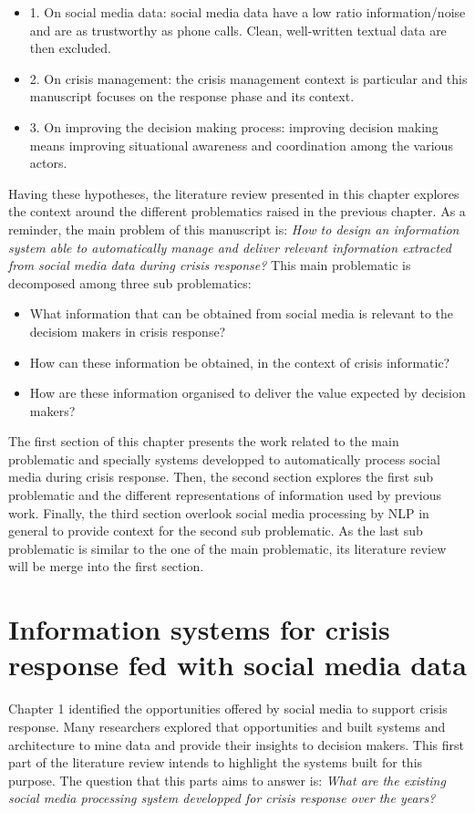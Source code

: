 \begin{itemize}
    \item 1. On social media data: social media data have a low ratio information/noise and are as trustworthy as phone calls. Clean, well-written textual data are then excluded.
    \item 2. On crisis management: the crisis management context is particular and this manuscript focuses on the response phase and its context.
    \item 3. On improving the decision making process: improving decision making means improving situational awareness and coordination among the various actors.
\end{itemize}

Having these hypotheses, the literature review presented in this chapter explores the context around the different problematics raised in the previous chapter.
As a reminder, the main problem of this manuscript is: \emph{How to design an information system able to automatically manage and deliver relevant information extracted from social media data during crisis response?}
This main problematic is decomposed among three sub problematics:

\begin{itemize}
    \item What information that can be obtained from social media is relevant to the decisiom makers in crisis response?
    \item How can these information be obtained, in the context of crisis informatic?
    \item How are these information organised to deliver the value expected by decision makers?
\end{itemize}

The first section of this chapter presents the work related to the main problematic and specially systems developped to automatically process social media during crisis response.
Then, the second section explores the first sub problematic and the different representations of information used by previous work.
Finally, the third section overlook social media processing by NLP in general to provide context for the second sub problematic.
As the last sub problematic is similar to the one of the main problematic, its literature review will be merge into the first section.

\section{Information systems for crisis response fed with social media data}
Chapter 1 identified the opportunities offered by social media to support crisis response.
Many researchers explored that opportunities and built systems and architecture to mine data and provide their insights to decision makers.
This first part of the literature review intends to highlight the systems built for this purpose.
The question that this parts aims to answer is: \emph{What are the existing social media processing system developped for crisis response over the years?}

